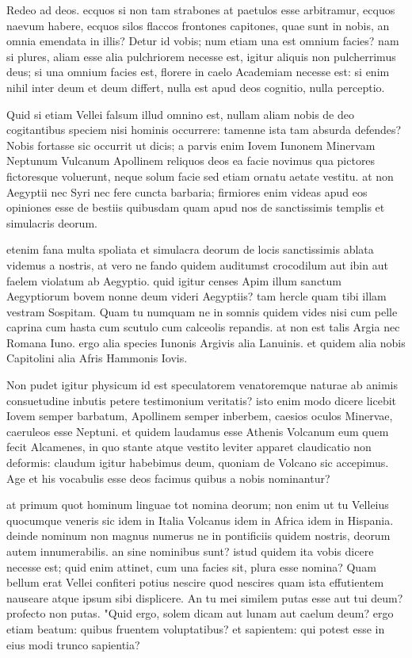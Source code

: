  Redeo ad deos. ecquos si non tam strabones at paetulos esse arbitramur, ecquos naevum habere, ecquos silos flaccos frontones capitones, quae sunt in nobis, an omnia emendata in illis? Detur id vobis; num etiam una est omnium facies? nam si plures, aliam esse alia pulchriorem necesse est, igitur aliquis non pulcherrimus deus; si una omnium facies est, florere in caelo Academiam necesse est: si enim nihil inter deum et deum differt, nulla est apud deos cognitio, nulla perceptio.

 Quid si etiam Vellei falsum illud omnino est, nullam aliam nobis de deo cogitantibus speciem nisi hominis occurrere: tamenne ista tam absurda defendes? Nobis fortasse sic occurrit ut dicis; a parvis enim Iovem Iunonem Minervam Neptunum Vulcanum Apollinem reliquos deos ea facie novimus qua pictores fictoresque voluerunt, neque solum facie sed etiam ornatu aetate vestitu. at non Aegyptii nec Syri nec fere cuncta barbaria; firmiores enim videas apud eos opiniones esse de bestiis quibusdam quam apud nos de sanctissimis templis et simulacris deorum.

 etenim fana multa spoliata et simulacra deorum de locis sanctissimis ablata videmus a nostris, at vero ne fando quidem auditumst crocodilum aut ibin aut faelem violatum ab Aegyptio. quid igitur censes Apim illum sanctum Aegyptiorum bovem nonne deum videri Aegyptiis? tam hercle quam tibi illam vestram Sospitam. Quam tu numquam ne in somnis quidem vides nisi cum pelle caprina cum hasta cum scutulo cum calceolis repandis. at non est talis Argia nec Romana Iuno. ergo alia species Iunonis Argivis alia Lanuinis. et quidem alia nobis Capitolini alia Afris Hammonis Iovis.

 Non pudet igitur physicum id est speculatorem venatoremque naturae ab animis consuetudine inbutis petere testimonium veritatis? isto enim modo dicere licebit Iovem semper barbatum, Apollinem semper inberbem, caesios oculos Minervae, caeruleos esse Neptuni. et quidem laudamus esse Athenis Volcanum eum quem fecit Alcamenes, in quo stante atque vestito leviter apparet claudicatio non deformis: claudum igitur habebimus deum, quoniam de Volcano sic accepimus. Age et his vocabulis esse deos facimus quibus a nobis nominantur?

 at primum quot hominum linguae tot nomina deorum; non enim ut tu Velleius quocumque veneris sic idem in Italia Volcanus idem in Africa idem in Hispania. deinde nominum non magnus numerus ne in pontificiis quidem nostris, deorum autem innumerabilis. an sine nominibus sunt? istud quidem ita vobis dicere necesse est; quid enim attinet, cum una facies sit, plura esse nomina? Quam bellum erat Vellei confiteri potius nescire quod nescires quam ista effutientem nauseare atque ipsum sibi displicere. An tu mei similem putas esse aut tui deum? profecto non putas. "Quid ergo, solem dicam aut lunam aut caelum deum? ergo etiam beatum: quibus fruentem voluptatibus? et sapientem: qui potest esse in eius modi trunco sapientia?

